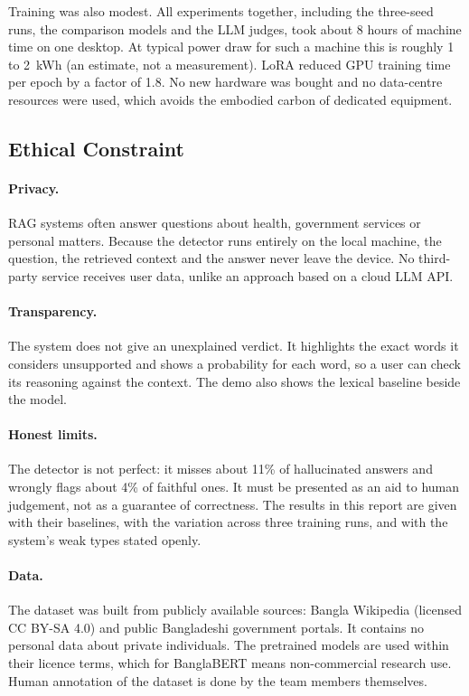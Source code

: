 Training was also modest. All experiments together, including the three-seed
runs, the comparison models and the LLM judges, took about 8 hours of machine
time on one desktop. At typical power draw for such a machine this is roughly
1 to 2~kWh (an estimate, not a measurement). LoRA reduced GPU training time per
epoch by a factor of 1.8. No new hardware was bought and no data-centre
resources were used, which avoids the embodied carbon of dedicated equipment.

\subsection{Ethical Constraint}

\paragraph{Privacy.} RAG systems often answer questions about health,
government services or personal matters. Because the detector runs entirely on
the local machine, the question, the retrieved context and the answer never
leave the device. No third-party service receives user data, unlike an
approach based on a cloud LLM API.

\paragraph{Transparency.} The system does not give an unexplained verdict. It
highlights the exact words it considers unsupported and shows a probability
for each word, so a user can check its reasoning against the context. The demo
also shows the lexical baseline beside the model.

\paragraph{Honest limits.} The detector is not perfect: it misses about 11\% of
hallucinated answers and wrongly flags about 4\% of faithful ones. It must be
presented as an aid to human judgement, not as a guarantee of correctness. The
results in this report are given with their baselines, with the variation
across three training runs, and with the system's weak types stated openly.

\paragraph{Data.} The dataset was built from publicly available sources: Bangla
Wikipedia (licensed CC BY-SA 4.0) and public Bangladeshi government portals. It
contains no personal data about private individuals. The pretrained models are
used within their licence terms, which for BanglaBERT means non-commercial
research use. Human annotation of the dataset is done by the team members
themselves.

